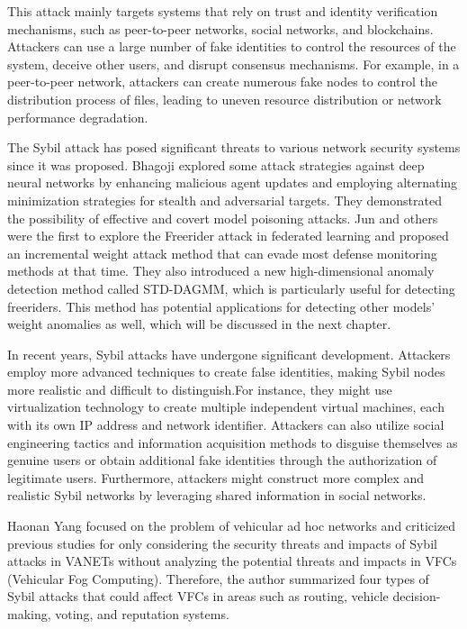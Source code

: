 \documentclass[conference]{IEEEtran}
\begin{document}
This attack mainly targets systems that rely on trust and identity verification mechanisms, 
such as peer-to-peer networks, social networks, and blockchains. Attackers can use a large number of fake identities to control the resources of the system, deceive other users,
and disrupt consensus mechanisms. For example, in a peer-to-peer network, attackers can create numerous fake nodes to control the distribution process of files,
leading to uneven resource distribution or network performance degradation.

The Sybil attack has posed significant threats to various network security systems since it was 
proposed. Bhagoji \cite{b111} explored some attack strategies against deep neural networks by enhancing 
malicious agent updates and employing alternating minimization strategies for stealth and adversarial 
targets. They demonstrated the possibility of effective and covert model poisoning attacks. 
Jun  \cite{b112} and others were the first to explore the Freerider attack in federated learning and proposed 
an incremental weight attack method that can evade most defense monitoring methods at that time. 
They also introduced a new high-dimensional anomaly detection method called STD-DAGMM, which is 
particularly useful for detecting freeriders. This method has potential applications for detecting 
other models' weight anomalies as well, which will be discussed in the next chapter.

In recent years, Sybil attacks have undergone significant development. 
Attackers employ more advanced techniques to create false identities, making Sybil nodes 
more realistic and difficult to distinguish.For instance, they might use virtualization technology
to create multiple independent virtual machines, each with its own IP address and network identifier.
Attackers can also utilize social engineering tactics and information acquisition methods to disguise 
themselves as genuine users or obtain additional fake identities through the authorization of 
legitimate users. Furthermore, attackers might construct more complex and realistic Sybil networks 
by leveraging shared information in social networks. 

Haonan Yang \cite{b113} focused on the problem of vehicular ad hoc networks and criticized previous 
studies for only considering the security threats and impacts of Sybil attacks in VANETs without 
analyzing the potential threats and impacts in VFCs (Vehicular Fog Computing). 
Therefore, the author summarized four types of Sybil attacks that could affect VFCs in areas such 
as routing, vehicle decision-making, voting, and reputation systems.
\end{document}
